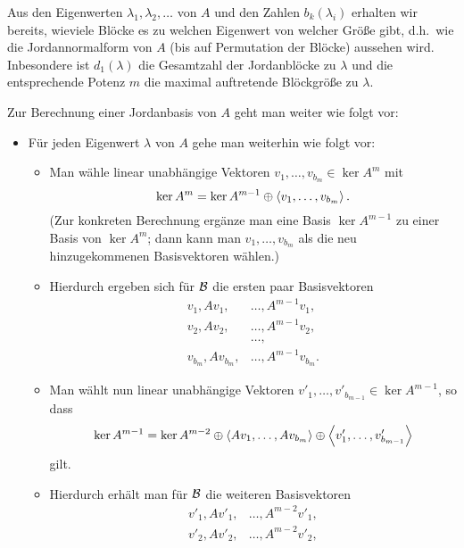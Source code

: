 Aus den Eigenwerten $\lambda_1, \lambda_2, \dotsc$ von $A$ und den Zahlen $b_k(\lambda_i)$ erhalten wir bereits, wieviele Blöcke es zu welchen Eigenwert von welcher Größe gibt, d.h.\ wie die Jordannormalform von $A$ (bis auf Permutation der Blöcke) aussehen wird.
Inbesondere ist $d_1(\lambda)$ die Gesamtzahl der Jordanblöcke zu $\lambda$ und die entsprechende Potenz $m$ die maximal auftretende Blöckgröße zu $\lambda$.

Zur Berechnung einer Jordanbasis von $A$ geht man weiter wie folgt vor:

\begin{itemize}[resume]
  \item
    Für jeden Eigenwert $\lambda$ von $A$ gehe man weiterhin wie folgt vor:
    \begin{itemize}
      \item
        Man wähle linear unabhängige Vektoren $v_1, \dotsc, v_{b_m} \in \ker A^m$ mit
        \[
                    \ker A^m
          =         \ker A^{m-1}
            \oplus  \left\langle v_1, \dotsc, v_{b_m} \right\rangle.
        \]
        (Zur konkreten Berechnung ergänze man eine Basis $\ker A^{m-1}$ zu einer Basis von $\ker A^m$; dann kann man $v_1, \dotsc, v_{b_m}$ als die neu hinzugekommenen Basisvektoren wählen.)
      \item
        Hierdurch ergeben sich für $\mathcal{B}$ die ersten paar Basisvektoren
        \begin{align*}
          v_1,     A v_1,     &\dotsc, A^{m-1} v_1,     \\
          v_2,     A v_2,     &\dotsc, A^{m-1} v_2,     \\
                              &\dotsc,                  \\
          v_{b_m}, A v_{b_m}, &\dotsc, A^{m-1} v_{b_m}.
        \end{align*}
      \item
        Man wählt nun linear unabhängige Vektoren $v'_1, \dotsc, v'_{b_{m-1}} \in \ker A^{m-1}$, so dass
        \[
                    \ker A^{m-1}
          =         \ker A^{m-2}
            \oplus  \left\langle  A v_1, \dotsc, A v_{b_m}  \right\rangle
            \oplus  \left\langle  v'_1, \dotsc, v'_{b_{m-1}}  \right\rangle
        \]
        gilt.
      \item
        Hierdurch erhält man für $\mathcal{B}$ die weiteren Basisvektoren
        \begin{align*}
          v'_1,         A v'_1,         &\dotsc, A^{m-2} v'_1,          \\
          v'_2,         A v'_2,         &\dotsc, A^{m-2} v'_2,          \\

\end{align*}
\end{itemize}
\end{itemize}
